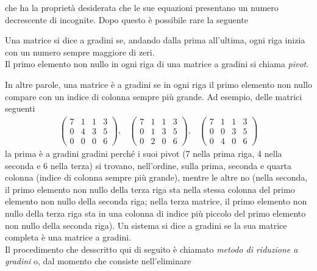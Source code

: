 che ha la proprietà desiderata che le sue equazioni presentano un numero
decrescente di incognite.
Dopo questo è possibile rare la seguente
\begin{defi}
  \label{defi:gauss-jorda1}
  Una matrice si dice a gradini se, andando dalla prima all'ultima,
  ogni riga inizia con un numero sempre maggiore di zeri.\\
  Il primo elemento non nullo in ogni riga di una matrice a gradini si
  chiama \textit{pivot}.
\end{defi}
In altre parole, una matrice è a gradini se in ogni riga il primo elemento
non nullo compare con un indice di colonna sempre più grande. Ad esempio,
delle matrici seguenti
\begin{eqnarray*}
  \begin{pmatrix}
    7 & 1 & 1 & 3\\
    0 & 4 & 3 & 5\\
    0 & 0 & 0 & 6
  \end{pmatrix}, &
                   \begin{pmatrix}
                     7 & 1 & 1 & 3\\
                     0 & 1 & 3 & 5\\
                     0 & 2 & 0 & 6
                   \end{pmatrix}, &
                                   \begin{pmatrix}
                                     7 & 1 & 1 & 3\\
                                     0 & 0 & 3 & 5\\
                                     0 & 4 & 0 & 6
                                   \end{pmatrix}
\end{eqnarray*}
la prima è a gradini gradini perché i suoi pivot (7 nella prima riga,
4 nella seconda e 6 nella terza) si trovano, nell'ordine, sulla prima,
seconda e quarta colonna (indice di colonna sempre più grande), mentre
le altre no (nella seconda, il primo elemento non nullo della terza riga
sta nella stessa colonna del primo elemento non nullo della seconda riga;
nella terza matrice, il primo elemento non nullo della terza riga sta in
una colonna di indice più piccolo del primo elemento non nullo della
seconda riga). Un sistema si dice a gradini se la sua matrice completa è
una matrice a gradini.\\
Il procedimento che desscritto qui di seguito è chiamato \textit{metodo
  di riduzione a gradini} o, dal momento che consiste nell'eliminare
